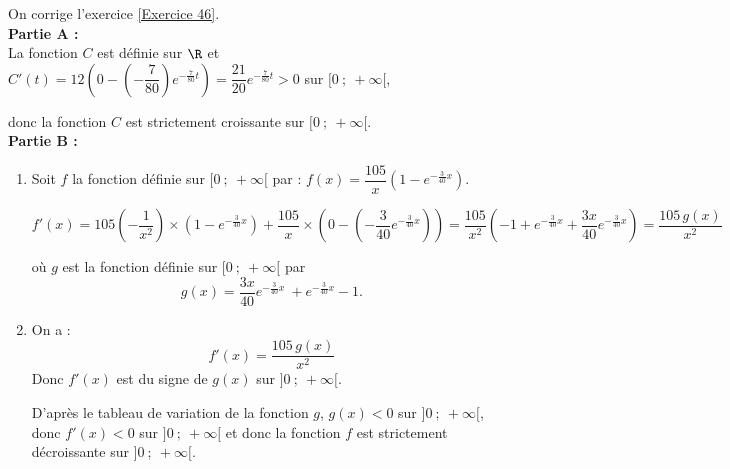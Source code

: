 \documentclass[12pt,fleqn]{report} %
\begin{document}
\begin{correction}
	On corrige l'exercice \ref{Exercice 46}.\\
	
	\textbf{Partie A :} \\
	La fonction $C$ est définie sur $\R$ et 
	$C'(t)=12\left (0-\left (-\dfrac{7}{80}\right ) e^{-\frac{7}{80}t}\right ) = \dfrac{21}{20}e^{-\frac{7}{80}t} >0$ sur $[0~;~+\infty[$, 
	
	donc la fonction $C$ est strictement croissante sur $[0~;~+\infty[$. \\
	
	\textbf{Partie B : }\\	
	\begin{enumerate}
		
		\item Soit $f$ la fonction définie sur $[0~;~+ \infty[$ par : 
		$f(x) = \dfrac{105}{x} \left(1 - e^{- \frac{3}{40}x}\right)$.
		
		
		
		$f'(x)= 105\left (-\dfrac{1}{x^2}\right ) \times \left(1 - e^{- \frac{3}{40}x}\right) + \dfrac{105}{x}\times \left ( 0 - \left ( -\dfrac{3}{40} e^{-\frac{3}{40}x}\right )\right )
		= \dfrac{105}{x^2} \left (  -1 + e^{-\frac{3}{40}x} + \dfrac{3x}{40} e^{-\frac{3}{40}x}\right )
		= \dfrac{105\,g(x)}{x^2}$
		
		où $g$ est la fonction définie sur $[0~;~+\infty[$ par \[g(x)=\dfrac{3x}{40}e^{- \frac{3}{40}x}\ + e^{- \frac{3}{40}x} - 1.\]
		
		\item On a : 
		\[
		f'(x)= \dfrac{105\,g(x)}{x^2}
		\]		
		Donc $f'(x)$ est du signe de $g(x)$ sur $]0~;~+\infty[$. 
		
		D'après le tableau de variation de la fonction $g$, $g(x)<0$ sur $]0~;~+\infty[$, donc $f'(x)<0$ sur $]0~;~+\infty[$ et donc la fonction $f$ est strictement décroissante sur $]0~;~+\infty[$.
		
	\end{enumerate}
\end{correction}
\end{document}
